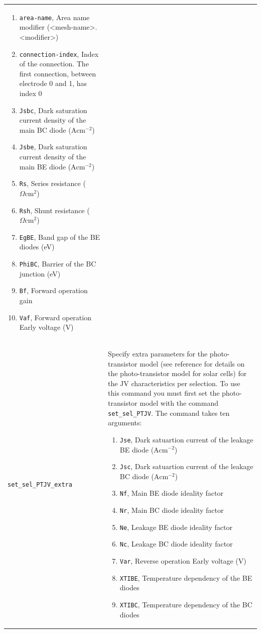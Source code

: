 \documentclass[noshowpacs,preprintnumbers,amsmath,amssymb, letter]{revtex4}
\begin{document}
\begin{longtable}{p{}p{}}
\begin{enumerate}
\item \texttt{area-name},  Area name modifier (\textless mesh-name\textgreater .\textless modifier\textgreater )
\item \texttt{connection-index}, Index of the connection. The first connection, between electrode 0 and 1,  has index 0
\item \texttt{Jsbc},  Dark saturation current density of the main BC diode ($\text{A}\text{cm}^{-2}$)
\item \texttt{Jsbe},  Dark saturation current density of the main BE diode  ($\text{A}\text{cm}^{-2}$)
\item \texttt{Rs}, Series resistance ($\Omega \text{cm}^2$)
\item \texttt{Rsh}, Shunt resistance ($\Omega \text{cm}^2$)
\item \texttt{EgBE},  Band gap of the BE diodes (eV)
\item \texttt{PhiBC},  Barrier of the BC junction (eV)
\item \texttt{Bf},  Forward operation gain 
\item \texttt{Vaf},  Forward operation Early voltage (V)
\end{enumerate}\\
\texttt{set\_sel\_PTJV\_extra}	&  Specify extra parameters for the photo-transistor model (see reference \cite{Walter:photo-T} for details on the photo-transistor model for solar cells) for the JV characteristics per selection. To use this command you must first set the photo-transistor model with the command \texttt{set\_sel\_PTJV}. The command takes ten arguments:
\begin{enumerate}
\item \texttt{Jse},  Dark satuartion current of the leakage BE diode ($\text{A}\text{cm}^{-2}$)
\item \texttt{Jsc},  Dark satuartion current of the leakage BC diode ($\text{A}\text{cm}^{-2}$)
\item \texttt{Nf},  Main BE diode ideality factor 
\item \texttt{Nr},  Main BC diode ideality factor 
\item \texttt{Ne},  Leakage BE diode ideality factor 
\item \texttt{Nc},  Leakage BC diode ideality factor
\item \texttt{Var},  Reverse operation Early voltage (V)
\item \texttt{XTIBE},  Temperature dependency of the BE diodes 
\item \texttt{XTIBC},  Temperature dependency of the BC diodes 

\end{enumerate}
\end{longtable}
\end{document}
